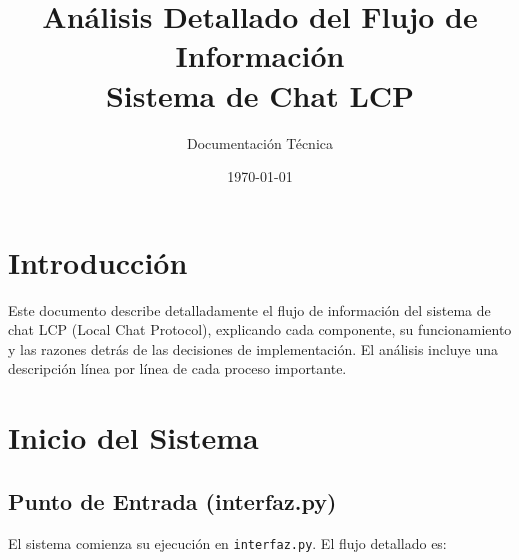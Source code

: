 \documentclass[12pt]{article}
\title{Análisis Detallado del Flujo de Información\\Sistema de Chat LCP}
\author{Documentación Técnica}
\date{\today}
\begin{document}
\maketitle

\tableofcontents

\section{Introducción}
Este documento describe detalladamente el flujo de información del sistema de chat LCP (Local Chat Protocol), explicando cada componente, su funcionamiento y las razones detrás de las decisiones de implementación. El análisis incluye una descripción línea por línea de cada proceso importante.

\section{Inicio del Sistema}
\subsection{Punto de Entrada (interfaz.py)}
El sistema comienza su ejecución en \texttt{interfaz.py}. El flujo detallado es:
\end{document}
